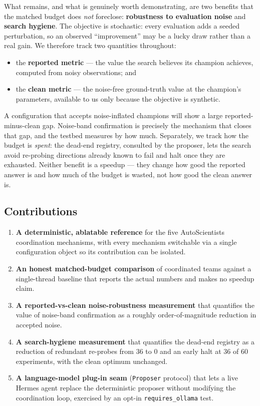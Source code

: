 \documentclass[
]{article}
\providecommand{\tightlist}{%
  \setlength{\itemsep}{0pt}\setlength{\parskip}{0pt}}
\begin{document}
What remains, and what is genuinely worth demonstrating, are two
benefits that the matched budget does \emph{not} foreclose:
\textbf{robustness to evaluation noise} and \textbf{search hygiene}. The
objective is stochastic: every evaluation adds a seeded perturbation, so
an observed ``improvement'' may be a lucky draw rather than a real gain.
We therefore track two quantities throughout:

\begin{itemize}
\tightlist
\item
  the \textbf{reported metric} --- the value the search believes its
  champion achieves, computed from noisy observations; and
\item
  the \textbf{clean metric} --- the noise-free ground-truth value at the
  champion's parameters, available to us only because the objective is
  synthetic.
\end{itemize}

A configuration that accepts noise-inflated champions will show a large
reported-minus-clean gap. Noise-band confirmation is precisely the
mechanism that closes that gap, and the testbed measures by how much.
Separately, we track how the budget is \emph{spent}: the dead-end
registry, consulted by the proposer, lets the search avoid re-probing
directions already known to fail and halt once they are exhausted.
Neither benefit is a speedup --- they change how good the reported
answer is and how much of the budget is wasted, not how good the clean
answer is.

\subsection{Contributions}\label{contributions}

\begin{enumerate}
\def\labelenumi{\arabic{enumi}.}
\tightlist
\item
  \textbf{A deterministic, ablatable reference} for the five
  AutoScientists coordination mechanisms, with every mechanism
  switchable via a single configuration object so its contribution can
  be isolated.
\item
  \textbf{An honest matched-budget comparison} of coordinated teams
  against a single-thread baseline that reports the actual numbers and
  makes no speedup claim.
\item
  \textbf{A reported-vs-clean noise-robustness measurement} that
  quantifies the value of noise-band confirmation as a roughly
  order-of-magnitude reduction in accepted noise.
\item
  \textbf{A search-hygiene measurement} that quantifies the dead-end
  registry as a reduction of redundant re-probes from \(36\) to \(0\)
  and an early halt at \(36\) of \(60\) experiments, with the clean
  optimum unchanged.
\item
  \textbf{A language-model plug-in seam} (\texttt{Proposer} protocol)
  that lets a live Hermes agent replace the deterministic proposer
  without modifying the coordination loop, exercised by an opt-in
  \texttt{requires\_ollama} test.
\end{enumerate}
\end{document}
